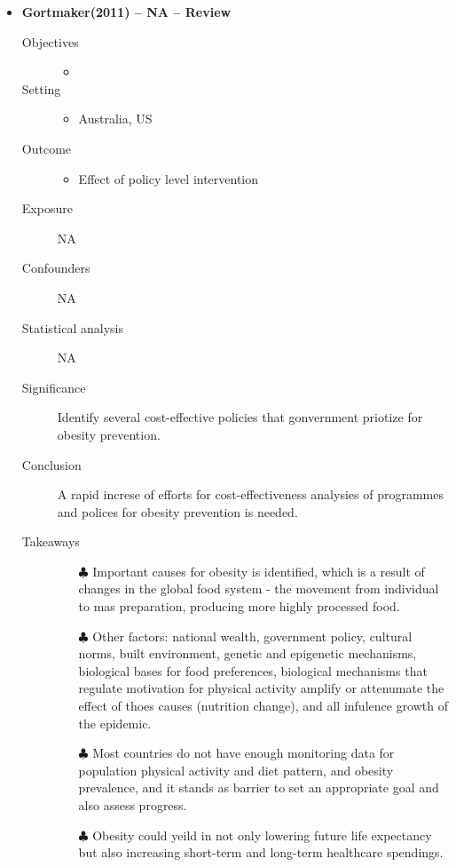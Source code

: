 \documentclass{article}
\begin{document}
\begin{itemize}
\item{\bf Gortmaker(2011) -- NA  -- Review} 
		\begin{description}
			\item[Objectives] 
				\begin{itemize}
					\item 
				\end{itemize} 
			\item[Setting] 
				\begin{itemize}
					\item Australia, US 
				\end{itemize} 
			\item[Outcome] 
				\begin{itemize}
					\item Effect of policy level intervention 
				\end{itemize} 
			\item[Exposure] NA
			\item[Confounders] NA
			\item[Statistical analysis] NA
			\item[Significance] Identify several cost-effective policies that gonvernment priotize for obesity prevention. 
			\item[Conclusion] A rapid increse of efforts for cost-effectiveness analysies of programmes and polices for obesity prevention is needed. 
			\item[Takeaways] \mbox{}\par
				\begin{itemize}
					\item[$\clubsuit$] Important causes for obesity is identified, which is a result of changes in the global food system - the movement from individual to mas preparation, producing more highly processed food.   
					\item[$\clubsuit$] Other factors: national wealth, government policy, cultural norms, built environment, genetic and epigenetic mechanisms, biological bases for food preferences, biological mechanisms that regulate motivation for physical activity amplify or attenumate the effect of thoes causes (nutrition change), and all infulence growth of the epidemic. 
					\item[$\clubsuit$] Most countries do not have enough monitoring data for population physical activity and diet pattern, and obesity prevalence, and it stands as barrier to set an appropriate goal and also assess progress. 
					\item[$\clubsuit$] Obesity could yeild in not only lowering future life expectancy but also increasing short-term and long-term healthcare spendings.

\end{itemize}
\end{description}
\end{itemize}
\end{document}

